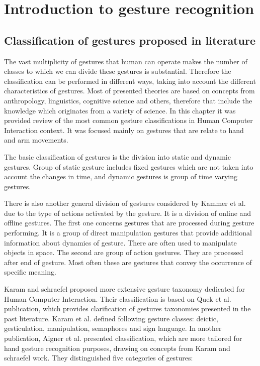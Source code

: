 \chapter{Introduction to gesture recognition}

\section{Classification of gestures proposed in literature}
The vast multiplicity of gestures that human can operate makes the number of classes to which we can divide these gestures is substantial. Therefore the classification can be performed in different ways, taking into account the different characteristics of gestures. Most of presented theories are based on concepts from anthropology, linguistics, cognitive science and others, therefore that include the knowledge which originates from a variety of science. In this chapter it was provided review of the most common gesture classifications in Human Computer Interaction context. It was focused mainly on gestures that are relate to hand and arm movements.

The basic classification of gestures is the division into static and dynamic gestures. Group of static gesture includes fixed gestures which are not taken into account the changes in time, and dynamic gestures is group of time varying gestures.

There is also another general division of gestures considered by Kammer et al. \cite{kammer_taxonomy_2010} due to the type of actions activated by the gesture. It is a division of online and offline gestures. The first one concerns gestures that are processed during gesture performing. It is a group of direct manipulation gestures that provide additional information about dynamics of gesture. There are often used to manipulate objects in space. The second are group of action gestures. They are processed after end of gesture. Most often these are gestures that convey the occurrence of specific meaning.

Karam and schraefel \cite{Karam05ataxonomy} proposed more extensive gesture taxonomy dedicated for Human Computer Interaction. Their classification is based on Quek et al. \cite{Quek:2002:MHD:568513.568514} publication, which provides clarification of gestures taxonomies presented in the past literature. Karam et al. defined following gesture classes: deictic, gesticulation, manipulation, semaphores and sign language. In another publication, Aigner et al. \cite{AignerTaxonomy} presented classification, which are more tailored for hand gesture recognition purposes, drawing on concepts from Karam and schraefel work. They distinguished five categories of gestures:

